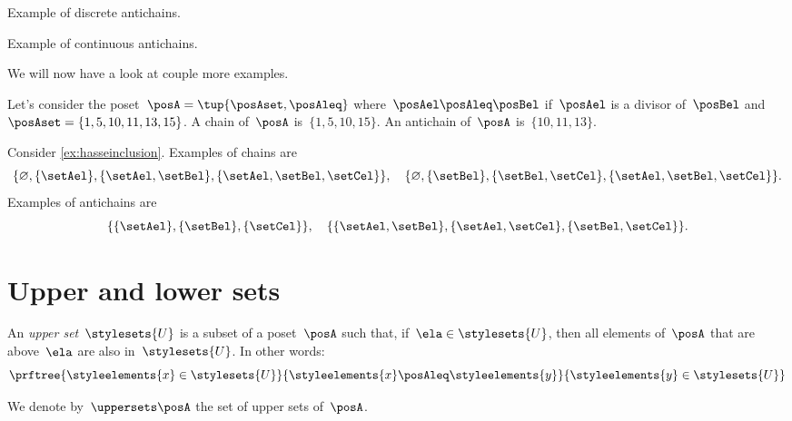 \begin{marginfigure}
    \centering
    \caption{Example of discrete antichains.}
    \label{fig:antichain}
\end{marginfigure}

\begin{marginfigure}
    \centering
    \caption{Example of continuous antichains.}
    \label{fig:antichain_2}
\end{marginfigure}

We will now have a look at couple more examples.
\begin{example}
    Let's consider the poset~$\posA=\tup{\posAset,\posAleq}$ where~$\posAel \posAleq \posBel$ if~$\posAel$ is a divisor of~$\posBel$ and~$\posAset=\{1,5,10,11,13,15\}$.
    A chain of~$\posA$ is~$\{1,5,10,15\}$. An antichain of~$\posA$ is~$\{10,11,13\}$.
\end{example}

\begin{example}
    Consider \cref{ex:hasseinclusion}. Examples of chains are
    \begin{equation}
        \{\varnothing,\{\setAel\},\{\setAel,\setBel\},\{\setAel,\setBel,\setCel\}\}, \quad  \{\varnothing,\{\setBel\},\{\setBel,\setCel\},\{\setAel,\setBel,\setCel\}\}.
    \end{equation}
    Examples of antichains are
    \begin{equation}
        \{\{\setAel\},\{\setBel\},\{\setCel\}\}, \quad \{ \{\setAel,\setBel\},\{\setAel,\setCel\}, \{\setBel,\setCel\}\}.
    \end{equation}
\end{example}


\section{Upper and lower sets}
\label{sec:UpperLowerSets}


\begin{definition}
    \label{def:upperset}
    An \emph{upper set}~$\stylesets{U}$ is a subset of a poset~$\posA$ such
    that, if~$\ela \in \stylesets{U}$, then all elements of~$\posA$ that are above~$\ela$ are also in~$\stylesets{U}$.
    In other words:
    \begin{equation}
        \prftree{\styleelements{x}\in \stylesets{U}}{\styleelements{x}\posAleq \styleelements{y}}{\styleelements{y}\in \stylesets{U}}
    \end{equation}
\end{definition}
We denote by~$\uppersets \posA$ the set of upper sets of~$\posA$.

